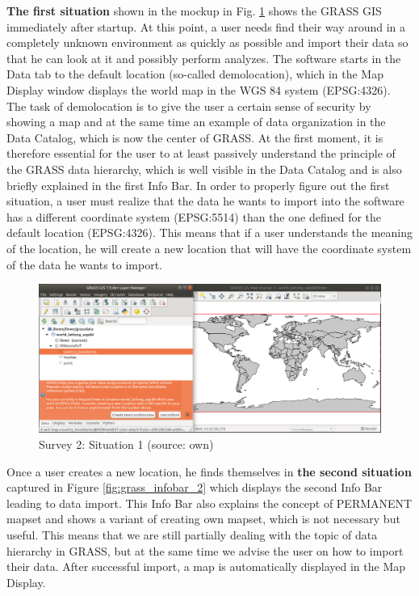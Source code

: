 \documentclass[a4paper,10pt,twoside]{article}
\begin{document}
\textbf{The first situation} shown in the mockup in Fig. \ref{fig:grass_infobar_1} shows the GRASS GIS immediately after startup. At this point, a user needs find their way around in a completely unknown environment as quickly as possible and import their data so that he can look at it and possibly perform analyzes. The software starts in the Data tab to the default location (so-called demolocation), which in the Map Display window displays the world map in the WGS 84 system (EPSG:4326). The task of demolocation is to give the user a certain sense of security by showing a map and at the same time an example of data organization in the Data Catalog, which is now the center of GRASS. At the first moment, it is therefore essential for the user to at least passively understand the principle of the GRASS data hierarchy, which is well visible in the Data Catalog and is also briefly explained in the first Info Bar. In order to properly figure out the first situation, a user must realize that the data he wants to import into the software has a different coordinate system (EPSG:5514) than the one defined for the default location (EPSG:4326). This means that if a user understands the meaning of the location, he will create a new location that will have the coordinate system of the data he wants to import.

\vspace{0.3cm}
\begin{figure}[hbt!] 
\begin{center}
\includegraphics[width=17cm]{../pictures/grass_infobar_1.png} 
\caption[Survey 2: Situation 1]{Survey 2: Situation 1 (source: own)}
\label{fig:grass_infobar_1}
\end{center}
\end{figure}

\noindent Once a user creates a new location, he finds themselves in \textbf{the second situation} captured in Figure \ref{fig:grass_infobar_2} which displays the second Info Bar leading to data import. This Info Bar also explains the concept of PERMANENT mapset and shows a variant of creating own mapset, which is not necessary but useful. This means that we are still partially dealing with the topic of data hierarchy in GRASS, but at the same time we advise the user on how to import their data. After successful import, a map is automatically displayed in the Map Display.
\end{document}

